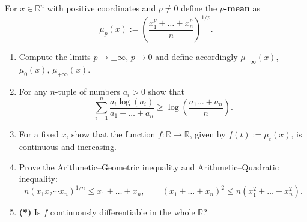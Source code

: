 
\begin{exercise}
\label{ex:p_means_monotonicity}
For $x \in \mathbb{R}^n$ with positive coordinates and $p \neq 0$ define the \textbf{$p$-mean} as
$$\mu_p(x) := \left(\frac{x_1^p + \dots + x_n^p}{n}\right)^{1/p}.$$
\begin{enumerate}[label=\textbf{(\alph*)}]
  \item Compute the limits $p \to \pm\infty$, $p \to 0$ and define accordingly
    $\mu_{-\infty}(x)$, $\mu_0(x)$, $\mu_{+\infty}(x)$.
  \item For any $n$-tuple of numbers $a_i > 0$ show that
    $$\sum_{i=1}^{n} \frac{a_i\log(a_i)}{a_1 + \dots + a_n} \geq \log\left(\frac{a_1 \dots + a_n}{n}\right).$$
  \item For a fixed $x$, show that the function $f : \mathbb{R}\to\mathbb{R}$, given by
    $f(t) := \mu_t(x)$, is continuous and increasing.
  \item Prove the Arithmetic--Geometric inequality and Arithmetic--Quadratic inequality:
    $$n(x_1x_2\cdots x_n)^{1/n} \leq x_1 + \dots + x_n, \qquad (x_1+\dots+x_n)^2 \leq n(x_1^2+\dots+x_n^2).$$
  \item \textbf{(*)} Is $f$ continuously differentiable in the whole $\mathbb{R}$?
\end{enumerate}
\end{exercise}

